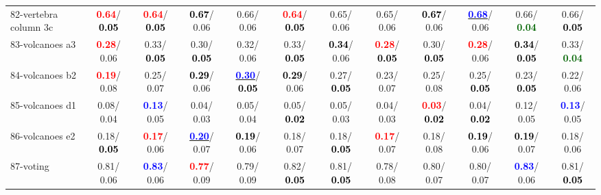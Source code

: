 \begin{table}[h]
\begin{center}
{\begin{tabular}{lc|c|c|c|c|c|c|c|c|c|c}
82-vertebra column 3c & \textcolor{red}{\textbf{  0.64}}/\textcolor{black}{\textbf{  0.05}} & \textcolor{red}{\textbf{  0.64}}/\textcolor{black}{\textbf{  0.05}} & \textcolor{black}{\textbf{  0.67}}/  0.06 &   0.66/  0.06 & \textcolor{red}{\textbf{  0.64}}/\textcolor{black}{\textbf{  0.05}} &   0.65/  0.06 &   0.65/  0.06 & \textcolor{black}{\textbf{  0.67}}/  0.06 & \underline{\textcolor{blue}{\textbf{  0.68}}}/  0.06 &   0.66/\textcolor{darkgreen}{\textbf{  0.04}} &   0.66/\textcolor{black}{\textbf{  0.05}} \\
83-volcanoes a3 & \textcolor{red}{\textbf{  0.28}}/  0.06 &   0.33/\textcolor{black}{\textbf{  0.05}} &   0.30/\textcolor{black}{\textbf{  0.05}} &   0.32/  0.06 &   0.33/\textcolor{black}{\textbf{  0.05}} & \textcolor{black}{\textbf{  0.34}}/  0.06 & \textcolor{red}{\textbf{  0.28}}/\textcolor{black}{\textbf{  0.05}} &   0.30/\textcolor{black}{\textbf{  0.05}} & \textcolor{red}{\textbf{  0.28}}/  0.06 & \textcolor{black}{\textbf{  0.34}}/\textcolor{black}{\textbf{  0.05}} &   0.33/\textcolor{darkgreen}{\textbf{  0.04}} \\
84-volcanoes b2 & \textcolor{red}{\textbf{  0.19}}/  0.08 &   0.25/  0.07 & \textcolor{black}{\textbf{  0.29}}/  0.06 & \underline{\textcolor{blue}{\textbf{  0.30}}}/\textcolor{black}{\textbf{  0.05}} & \textcolor{black}{\textbf{  0.29}}/  0.06 &   0.27/\textcolor{black}{\textbf{  0.05}} &   0.23/  0.07 &   0.25/  0.08 &   0.25/\textcolor{black}{\textbf{  0.05}} &   0.23/\textcolor{black}{\textbf{  0.05}} &   0.22/  0.06 \\
85-volcanoes d1 &   0.08/  0.04 & \textcolor{blue}{\textbf{  0.13}}/  0.05 &   0.04/  0.03 &   0.05/  0.04 &   0.05/\textcolor{black}{\textbf{  0.02}} &   0.05/  0.03 &   0.04/  0.03 & \textcolor{red}{\textbf{  0.03}}/\textcolor{black}{\textbf{  0.02}} &   0.04/\textcolor{black}{\textbf{  0.02}} &   0.12/  0.05 & \textcolor{blue}{\textbf{  0.13}}/  0.05 \\ \hline
86-volcanoes e2 &   0.18/\textcolor{black}{\textbf{  0.05}} & \textcolor{red}{\textbf{  0.17}}/  0.06 & \underline{\textcolor{blue}{\textbf{  0.20}}}/  0.07 & \textcolor{black}{\textbf{  0.19}}/  0.06 &   0.18/  0.07 &   0.18/\textcolor{black}{\textbf{  0.05}} & \textcolor{red}{\textbf{  0.17}}/  0.07 &   0.18/  0.08 & \textcolor{black}{\textbf{  0.19}}/  0.06 & \textcolor{black}{\textbf{  0.19}}/  0.07 &   0.18/  0.06 \\
87-voting &   0.81/  0.06 & \textcolor{blue}{\textbf{  0.83}}/  0.06 & \textcolor{red}{\textbf{  0.77}}/  0.09 &   0.79/  0.09 &   0.82/\textcolor{black}{\textbf{  0.05}} &   0.81/\textcolor{black}{\textbf{  0.05}} &   0.78/  0.08 &   0.80/  0.07 &   0.80/  0.07 & \textcolor{blue}{\textbf{  0.83}}/  0.06 &   0.81/\textcolor{black}{\textbf{  0.05}} \\

\end{tabular}}
\end{center}
\end{table}
